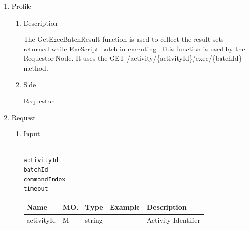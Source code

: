 \newpage


\begin{enumerate}

\item Profile

\begin{enumerate}

\item Description

The GetExecBatchResult function is used to collect the result sets returned while ExeScript batch in executing. 
This function is used by the Requestor Node.
It uses the GET /activity/\{activityId\}/exec/\{batchId\} method. 

\item Side

Requestor

\end{enumerate}

\item Request

\begin{enumerate}

\item Input

\begin{tcolorbox}[boxrule=0pt, frame empty]
\begin{verbatim}

activityId
batchId
commandIndex
timeout

\end{verbatim}
\end{tcolorbox}



\begin{table}[H]
\footnotesize

\begin{center}
\begin{tabular}{|p{3cm}|l|p{3cm}|p{3cm}|p{4cm}|} 
\hline
\rowcolor{lightgray}	Name	& MO.	& Type	& Example & 	Description \\
\hline

activityId				& M	& 	string				&			&	Activity Identifier \\ 
\hline


\end{tabular}
\end{center}
\end{table}
\end{enumerate}
\end{enumerate}
